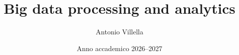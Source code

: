 \title{Big data processing and analytics}
\author{Antonio Villella}
\date{Anno accademico 2026--2027}

\maketitle
